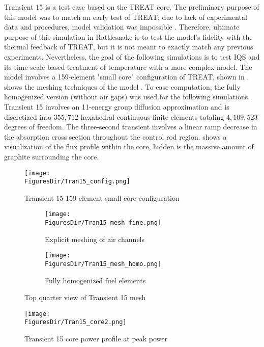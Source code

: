 Transient 15 is a test case based on the TREAT core. The preliminary purpose of this model was to match an early test of TREAT; due to lack of experimental data and procedures, model validation was impossible \cite{mammoth}. Therefore, ultimate purpose of this simulation in Rattlesnake is to test the model's fidelity with the thermal feedback of TREAT, but it is not meant to exactly match any previous experiments.  Nevertheless, the goal of the following simulations is to test IQS and its time scale based treatment of temperature with a more complex model. The model involves a 159-element "small core" configuration of TREAT, shown in  \cite{Tran15}.  shows the meshing techniques of the model \cite{mammoth}. To ease computation, the fully homogenized version (without air gaps) was used  for the following simulations. Transient 15 involves an 11-energy group diffusion approximation and is discretized into $355,712$ hexahedral continuous finite elements totaling $4,109,523$ degrees of freedom.  The three-second transient involves a linear ramp decrease in the absorption cross section throughout the control rod region.  shows a visualization of the flux profile within the core, hidden is the massive amount of graphite surrounding the core.   

\begin{figure}[htbp!]
\centering
\texttt{[image: \\FiguresDir/Tran15\_config.png]}
\caption{Transient 15 159-element small core configuration}
\label{fig:Tran15_config}
\end{figure}

\begin{figure}[!htbp]
\centering
\begin{subfigure}[!htbp]{0.49\textwidth}
\texttt{[image: \\FiguresDir/Tran15\_mesh\_fine.png]}
\caption{Explicit meshing of air channels}
\label{fig:Tran15_mesh_fine}
\end{subfigure}
\begin{subfigure}[!htbp]{0.49\textwidth}
\texttt{[image: \\FiguresDir/Tran15\_mesh\_homo.png]}
\caption{Fully homogenized fuel elements}
\label{fig:Tran15_mesh_homo}
\end{subfigure}
\caption{Top quarter view of Transient 15 mesh}
\label{fig:Tran15_mesh}
\end{figure}

\begin{figure}[htbp!]
\centering
\texttt{[image: \\FiguresDir/Tran15\_core2.png]}
\caption{Transient 15 core power profile at peak power}
\label{fig:Tran15}
\end{figure}

